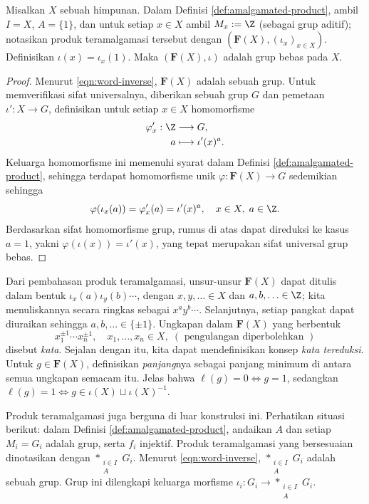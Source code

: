 \begin{proposition}
	Misalkan $X$ sebuah himpunan. Dalam Definisi \ref{def:amalgamated-product}, ambil $I = X$, $A = \{1\}$, dan untuk setiap $x \in X$ ambil $M_x := \Z$ (sebagai grup aditif); notasikan produk teramalgamasi tersebut dengan $(\mathbf{F}(X), (\iota_x)_{x \in X})$. Definisikan $\iota(x) = \iota_x(1)$. Maka $(\mathbf{F}(X), \iota)$ adalah grup bebas pada $X$.
\end{proposition}
\begin{proof}
	Menurut \eqref{eqn:word-inverse}, $\mathbf{F}(X)$ adalah sebuah grup. Untuk memverifikasi sifat universalnya, diberikan sebuah grup $G$ dan pemetaan $\iota': X \to G$, definisikan untuk setiap $x \in X$ homomorfisme
	\begin{align*}
		\varphi'_x: \Z & \longrightarrow G, \\
		a & \longmapsto \iota'(x)^a.
	\end{align*}
	Keluarga homomorfisme ini memenuhi syarat dalam Definisi \ref{def:amalgamated-product}, sehingga terdapat homomorfisme unik $\varphi: \mathbf{F}(X) \to G$ sedemikian sehingga
	\[ \varphi(\iota_x(a)) = \varphi'_x(a) = \iota'(x)^a, \quad x \in X, \; a \in \Z.  \]
	Berdasarkan sifat homomorfisme grup, rumus di atas dapat direduksi ke kasus $a=1$, yakni $\varphi(\iota(x)) = \iota'(x)$, yang tepat merupakan sifat universal grup bebas.
\end{proof}

Dari pembahasan produk teramalgamasi, unsur-unsur $\mathbf{F}(X)$ dapat ditulis dalam bentuk $\iota_x(a) \iota_y(b) \cdots$, dengan $x, y, \ldots \in X$ dan $a, b, \ldots \in \Z$; kita menuliskannya secara ringkas sebagai $x^a y^b \cdots$. Selanjutnya, setiap pangkat dapat diuraikan sehingga $a, b, \ldots \in \{\pm 1\}$. Ungkapan dalam $\mathbf{F}(X)$ yang berbentuk
\[ x_1^{\pm 1} \cdots x_n^{\pm 1}, \quad x_1, \ldots, x_n \in X,  \; (\text{ pengulangan diperbolehkan }) \]
disebut \emph{kata}. Sejalan dengan itu, kita dapat mendefinisikan konsep \emph{kata tereduksi}. Untuk $g \in \mathbf{F}(X)$, definisikan \emph{panjang}nya sebagai panjang minimum di antara semua ungkapan semacam itu. Jelas bahwa $\ell(g)=0 \iff g=1$, sedangkan $\ell(g)=1 \iff g \in \iota(X) \sqcup \iota(X)^{-1}$.

Produk teramalgamasi juga berguna di luar konstruksi ini. Perhatikan situasi berikut: dalam Definisi \ref{def:amalgamated-product}, andaikan $A$ dan setiap $M_i = G_i$ adalah grup, serta $f_i$ injektif. Produk teramalgamasi yang bersesuaian dinotasikan dengan $\ast_{\substack{i \in I \\ A}} G_i$. Menurut \eqref{eqn:word-inverse}, $\ast_{\substack{i \in I \\ A}} G_i$ adalah sebuah grup. Grup ini dilengkapi keluarga morfisme $\iota_i: G_i \to \ast_{\substack{i \in I \\ A}} G_i$.

